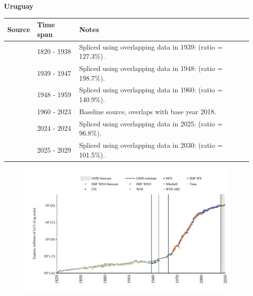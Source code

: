 \documentclass[12pt,a4paper,landscape]{article}
\begin{document}
\begin{adjustbox}{max totalsize={\paperwidth}{\paperheight},center}
\begin{minipage}[t][\textheight][t]{\textwidth}
\vspace*{0.5cm}
{}
\begin{center}
{\Large\bfseries Uruguay}
\end{center}
\vspace{0.5cm}
\begin{table}[H]
\centering
\small
\begin{tabular}{|l|l|l|}
\hline
\textbf{Source} & \textbf{Time span} & \textbf{Notes} \\
\hline
\rowcolor{white}\cite{Tena}& 1820 - 1938 &Spliced using overlapping data in 1939: (ratio = 127.3\%).\\
\rowcolor{lightgray}\cite{HFS}& 1939 - 1947 &Spliced using overlapping data in 1948: (ratio = 198.7\%).\\
\rowcolor{white}\cite{Mitchell}& 1948 - 1959 &Spliced using overlapping data in 1960: (ratio = 140.9\%).\\
\rowcolor{lightgray}\cite{WDI}& 1960 - 2023 &Baseline source, overlaps with base year 2018.\\
\rowcolor{white}\cite{IMF_IFS}& 2024 - 2024 &Spliced using overlapping data in 2025: (ratio = 96.8\%).\\
\rowcolor{lightgray}\cite{IMF_WEO_forecast}& 2025 - 2029 &Spliced using overlapping data in 2030: (ratio = 101.5\%).\\
\hline
\end{tabular}
\end{table}
\begin{figure}[H]
\centering
\includegraphics[width=\textwidth,height=0.6\textheight,keepaspectratio]{graphs/URY_exports.pdf}
\end{figure}
\end{minipage}
\end{adjustbox}
\end{document}
